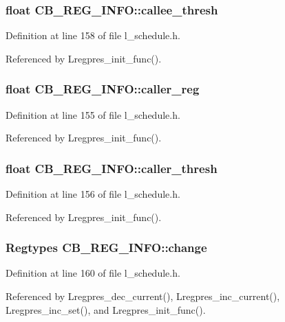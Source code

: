 \subsubsection{\setlength{\rightskip}{0pt plus 5cm}float \bf{CB\_\-REG\_\-INFO::callee\_\-thresh}}\label{structCB__REG__INFO_d7cb761eff1bd8abadff7050113e9e48}




Definition at line 158 of file l\_\-schedule.h.

Referenced by Lregpres\_\-init\_\-func().
\subsubsection{\setlength{\rightskip}{0pt plus 5cm}float \bf{CB\_\-REG\_\-INFO::caller\_\-reg}}\label{structCB__REG__INFO_bbfee6c098040e43a2961e34b252b8d6}




Definition at line 155 of file l\_\-schedule.h.

Referenced by Lregpres\_\-init\_\-func().
\subsubsection{\setlength{\rightskip}{0pt plus 5cm}float \bf{CB\_\-REG\_\-INFO::caller\_\-thresh}}\label{structCB__REG__INFO_df148a1508312db2e6c1d8cfa50f00bf}




Definition at line 156 of file l\_\-schedule.h.

Referenced by Lregpres\_\-init\_\-func().
\subsubsection{\setlength{\rightskip}{0pt plus 5cm}\bf{Regtypes} \bf{CB\_\-REG\_\-INFO::change}}\label{structCB__REG__INFO_74c08203c7eeffe64de7c5e7d27fc2e1}




Definition at line 160 of file l\_\-schedule.h.

Referenced by Lregpres\_\-dec\_\-current(), Lregpres\_\-inc\_\-current(), Lregpres\_\-inc\_\-set(), and Lregpres\_\-init\_\-func().

